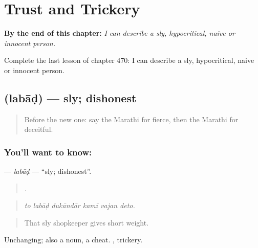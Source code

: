 
\chapter{Trust and Trickery}
\label{ch:mr-trust-and-trickery}

\begin{chapteropening}
\textbf{By the end of this chapter:} \emph{I can describe a sly, hypocritical, naive or innocent person.}

Complete the last lesson of chapter 470: I can describe a sly, hypocritical, naive or innocent person.
\end{chapteropening}

\section[\texorpdfstring{\mr{लबाड} (labāḍ)}{लबाड (labāḍ)}]{ (labāḍ) — sly; dishonest}

\label{lesson:MR-C470-labad}



\begin{quote}
Before the new one: say the Marathi for fierce, then the Marathi for deceitful.
\end{quote}

\subsection*{You'll want to know: }
\textbf{} — \emph{labāḍ} — \textquotedblleft{}sly; dishonest\textquotedblright{}.

\begin{quote}
     .
\end{quote}

\begin{quote}
\emph{to labāḍ dukāndār kamī vajan deto.}
\end{quote}

\begin{quote}
That sly shopkeeper gives short weight.
\end{quote}

Unchanging; also a noun, a cheat. , trickery.

